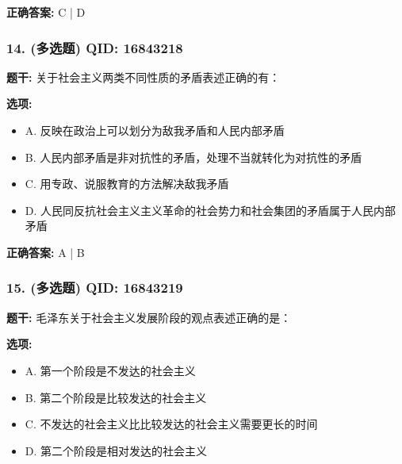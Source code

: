 \documentclass[12pt,UTF8]{ctexart}
\begin{document}
\textbf{正确答案:}
C | D

\vspace{0.3em}\hrulefill\vspace{0.7em}

\subsubsection*{14. (多选题) \small QID: 16843218}

\textbf{题干:}
关于社会主义两类不同性质的矛盾表述正确的有：

\textbf{选项:}
\begin{itemize}[leftmargin=*]

  \item A. 反映在政治上可以划分为敌我矛盾和人民内部矛盾

  \item B. 人民内部矛盾是非对抗性的矛盾，处理不当就转化为对抗性的矛盾

  \item C. 用专政、说服教育的方法解决敌我矛盾

  \item D. 人民同反抗社会主义主义革命的社会势力和社会集团的矛盾属于人民内部矛盾

\end{itemize}

\textbf{正确答案:}
A | B

\vspace{0.3em}\hrulefill\vspace{0.7em}

\subsubsection*{15. (多选题) \small QID: 16843219}

\textbf{题干:}
毛泽东关于社会主义发展阶段的观点表述正确的是：

\textbf{选项:}
\begin{itemize}[leftmargin=*]

  \item A. 第一个阶段是不发达的社会主义

  \item B. 第二个阶段是比较发达的社会主义

  \item C. 不发达的社会主义比比较发达的社会主义需要更长的时间

  \item D. 第二个阶段是相对发达的社会主义

\end{itemize}
\end{document}
